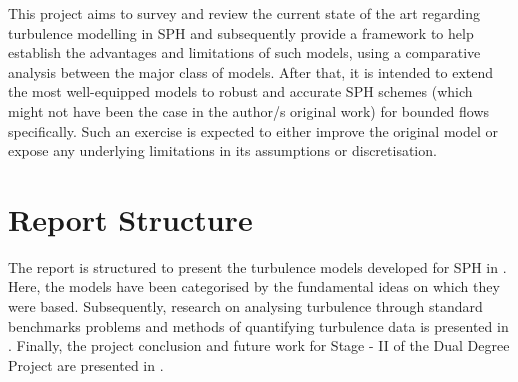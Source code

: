This project aims to survey and review the current state of the art regarding turbulence modelling in SPH and subsequently provide a framework to help establish the advantages and limitations of such models, using a comparative analysis between the major class of models.
After that, it is intended to extend the most well-equipped models to robust and accurate SPH schemes (which might not have been the case in the author/s original work) for bounded flows specifically. Such an exercise is expected to either improve the original model or expose any underlying limitations in its assumptions or discretisation.

\section{Report Structure}
The report is structured to present the turbulence models developed for SPH in . Here, the models have been categorised by the fundamental ideas on which they were based. Subsequently, research on analysing turbulence through standard benchmarks problems and methods of quantifying turbulence data is presented in .
Finally, the project conclusion and future work for Stage - II of the Dual Degree Project are presented in .
